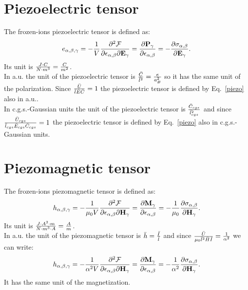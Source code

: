 \documentclass[12pt,a4paper]{article}
\begin{document}
\newpage
\section{\color{coral}Piezoelectric tensor}
The frozen-ions piezoelectric tensor is defined as:
\begin{equation}
e_{\alpha,\beta,\gamma}=-{1\over V} {\partial^2 \mathcal{F} \over \partial 
\epsilon_{\alpha,\beta} \partial {\bf E}_{\gamma}}={\partial 
{\bf P}_{\gamma} \over \partial \epsilon_{\alpha,\beta}}=
-{\partial \sigma_{\alpha,\beta} \over
\partial {\bf E}_{\gamma}}.
\label{piezo}
\end{equation}
Its unit is ${J\cdot C \over N \cdot m^3}= {C\over m^2}$.
\\

{\color{web-blue} In a.u. the unit of the piezoelectric tensor is
${\bar C \over \bar l^2}={e\over a_B^2}$ so it has the same unit of the
polarization. Since  
${\bar U \over \bar l \bar E \bar C}=1$ the piezoelectric tensor is
defined by Eq.~\ref{piezo} also in a.u..
}
\\

{\color{orange} In c.g.s.-Gaussian units the unit of the piezoelectric
tensor is
${\bar C_{cgs} \over \bar l_{cgs}^2}$ and since 
${\bar U_{cgs} \over \bar l_{cgs} \bar E_{cgs} \bar C_{cgs}}=1$ 
the piezoelectric tensor is
defined by Eq.~\ref{piezo} also in c.g.s.-Gaussian units.
}

\newpage
\section{\color{coral}Piezomagnetic tensor}
The frozen-ions piezomagnetic tensor is defined as:
\begin{equation}
h_{\alpha,\beta,\gamma}=-{1\over \mu_0 V} 
{\partial^2 \mathcal{F} \over \partial 
\epsilon_{\alpha,\beta} \partial {\bf H}_{\gamma}}=
{\partial {\bf M}_{\gamma} \over \partial 
\epsilon_{\alpha,\beta}}=-{1\over \mu_0} 
{\partial \sigma_{\alpha,\beta} \over \partial {\bf H}_{\gamma}}.
\end{equation}
Its unit is ${J \cdot A^2 \cdot m\over N \cdot m^3 \cdot A}= {A\over m}$.
\\

{\color{web-blue} In a.u. the unit of the piezomagnetic tensor is
$\bar h={\bar I \over \bar l}$ and since 
${\bar U \over \mu_0 \bar l^2 \bar H \bar I}={1\over \alpha^2}$ we can write:
\begin{equation}
h_{\alpha,\beta,\gamma}=-{1\over \alpha^2 V} 
{\partial^2 \mathcal{F} \over \partial 
\epsilon_{\alpha,\beta} \partial {\bf H}_{\gamma}}=
{\partial {\bf M}_{\gamma} \over \partial 
\epsilon_{\alpha,\beta}}=-{1\over \alpha^2} 
{\partial \sigma_{\alpha,\beta} \over \partial {\bf H}_{\gamma}}.
\end{equation}
It has the same unit of the magnetization.
}
\\
\end{document}
